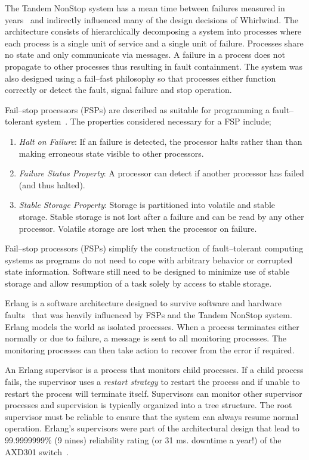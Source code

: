 \documentclass[conference]{IEEEtran}
\begin{document}
The Tandem NonStop system has a mean time between failures measured in years~\cite{Grey85Fail} and indirectly influenced many of the design decisions of Whirlwind. The architecture consists of hierarchically decomposing a system into processes where each process is a single unit of service and a single unit of failure. Processes share no state and only communicate via messages. A failure in a process does not propagate to other processes thus resulting in fault containment. The system was also designed using a fail--fast philosophy so that processes either function correctly or detect the fault, signal failure and stop operation.

Fail--stop processors (FSPs) are described as suitable for programming a fault--tolerant system~\cite{Schneider:FailStopProcessors}. The properties considered necessary for a FSP include;

\begin{enumerate}
	\item \emph{Halt on Failure}: If an failure is detected, the processor halts rather than than making erroneous state visible to other processors.
	\item \emph{Failure Status Property}: A processor can detect if another processor has failed (and thus halted).
	\item \emph{Stable Storage Property}: Storage is partitioned into volatile and stable storage. Stable storage is not lost after a failure and can be read by any other processor. Volatile storage are lost when the processor on failure.
\end{enumerate}

Fail--stop processors (FSPs) simplify the construction of fault--tolerant computing systems as programs do not need to cope with arbitrary behavior or corrupted state information. Software still need to be designed to minimize use of stable storage and allow resumption of a task solely by access to stable storage. 

Erlang is a software architecture designed to survive software and hardware faults~\cite{Armstrong03Thesis} that was heavily influenced by FSPs and the Tandem NonStop system. Erlang models the world as isolated processes. When a process terminates either normally or due to failure, a message is sent to all monitoring processes. The monitoring processes can then take action to recover from the error if required.

An Erlang supervisor is a process that monitors child processes. If a child process fails, the supervisor uses a \emph{restart strategy} to restart the process and if unable to restart the process will terminate itself. Supervisors can monitor other supervisor processes and supervision is typically organized into a tree structure. The root supervisor must be reliable to ensure that the system can always resume normal operation. Erlang's supervisors were part of the architectural design that lead to 99.9999999\% (9 nines) reliability rating (or 31 ms. downtime a year!) of the AXD301 switch~\cite{armstrong:02:COP}.
\end{document}
